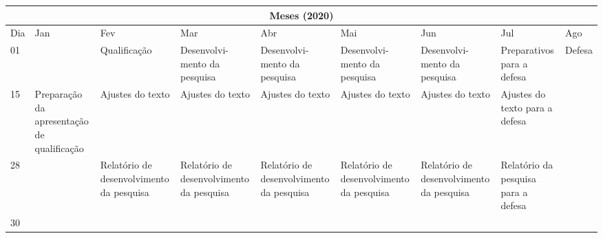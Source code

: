 \documentclass[a4paper,11pt]{article}
\date{\today}
\author{Jefferson Bezerra dos Santos}
\begin{document}
	\setlength{\tabcolsep}{6pt}
	\begin{table}
		\scriptsize
		\begin{tabular}{|p{0.28cm}|>{\raggedright}p{1.3cm}|>{\raggedright}p{1.4cm}|>{\raggedright}p{1.4cm}|p{1.4cm}|p{1.4cm}|p{1.5cm}|p{1.5cm}|p{1.5cm}|}
	\hline
	\multicolumn{9}{|c|}{Meses (2020)}\\
	\hline
	 Dia &Jan & Fev & Mar & Abr & Mai & Jun & Jul & Ago \\
	 \hline
	 01 &  & Qualifica\c c\~ao & Desenvolvi-mento da pesquisa & Desenvolvi-mento da pesquisa  & Desenvolvi-mento da
	 pesquisa  & Desenvolvi-mento da pesquisa   & Preparativos para a defesa & Defesa\\[1.0cm]
	 \hline
	 15 & Prepara\c c\~ao da apresenta\c c\~ao de qualifica\c c\~ao & Ajustes  do texto  &Ajustes  do texto  & Ajustes
	 do texto &Ajustes  do texto & Ajustes  do texto  & Ajustes do texto para a defesa&\\[1.2cm]
	 \hline
	 28 &  & Relat\'orio de desenvolvimento da pesquisa & Relat\'orio de desenvolvimento da pesquisa & Relat\'orio de
	 desenvolvimento da pesquisa&Relat\'orio de desenvolvimento da pesquisa & Relat\'orio de desenvolvimento da pesquisa
	 & Relat\'orio da pesquisa para a defesa&\\[1.2cm]
	 \hline
	 30 &  &   &  & & &  &  &\\
	\hline
	\end{tabular}
\end{table}
\end{document}

